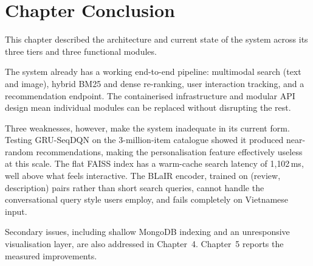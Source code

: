 \section{Chapter Conclusion}

This chapter described the architecture and current state of the system across its three tiers and three functional modules.

The system already has a working end-to-end pipeline: multimodal search (text and image), hybrid BM25 and dense re-ranking, user interaction tracking, and a recommendation endpoint. The containerised infrastructure and modular API design mean individual modules can be replaced without disrupting the rest.

Three weaknesses, however, make the system inadequate in its current form.
Testing GRU-SeqDQN on the 3-million-item catalogue showed it produced near-random recommendations, making the personalisation feature effectively useless at this scale.
The flat FAISS index has a warm-cache search latency of 1{,}102\,ms, well above what feels interactive.
The BLaIR encoder, trained on (review, description) pairs rather than short search queries, cannot handle the conversational query style users employ, and fails completely on Vietnamese input.

Secondary issues, including shallow MongoDB indexing and an unresponsive visualisation layer, are also addressed in Chapter~4. Chapter~5 reports the measured improvements.

